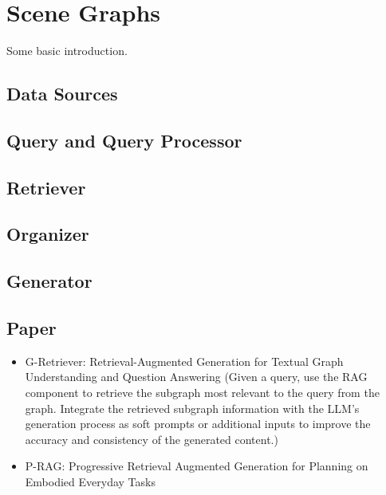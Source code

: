 \newpage
\section{Scene Graphs \emojiscenetitle}\label{sec-scene}
Some basic introduction.
\subsection{Data Sources}

\subsection{Query and Query Processor}

\subsection{Retriever}

\subsection{Organizer}

\subsection{Generator}

\subsection{Paper}

\begin{itemize}
    \item G-Retriever: Retrieval-Augmented Generation for Textual Graph Understanding and Question Answering (Given a query, use the RAG component to retrieve the subgraph most relevant to the query from the graph. Integrate the retrieved subgraph information with the LLM's generation process as soft prompts or additional inputs to improve the accuracy and consistency of the generated content.)

    \item P-RAG: Progressive Retrieval Augmented Generation for Planning on Embodied Everyday Tasks

\end{itemize}